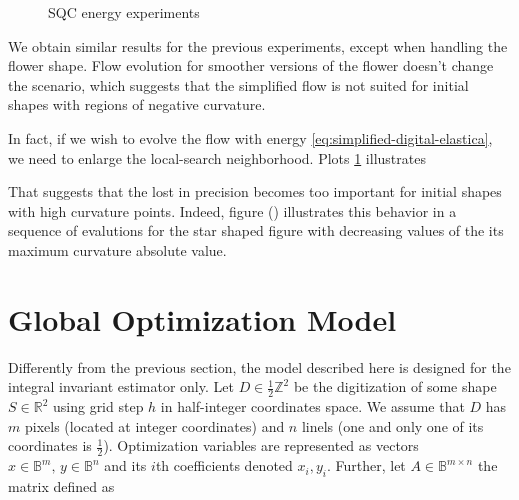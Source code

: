 \begin{figure}[h!]
{}\hspace{1em}%
\hspace{1em}%
\caption{SQC energy experiments}
\label{fig:sqc-energy-experiments}
\end{figure}

We obtain similar results for the previous experiments, except when handling the flower shape. Flow evolution for smoother versions of the flower doesn't change the scenario, which suggests that the simplified flow is not suited for initial shapes with regions of negative curvature.

In fact, if we wish to evolve the flow with energy \eqref{eq:simplified-digital-elastica}, we need to enlarge the local-search neighborhood. Plots \ref{} illustrates




That suggests that the lost in precision becomes too important for initial shapes with high curvature points. Indeed, figure () illustrates this behavior in a sequence of evalutions for the star shaped figure with decreasing values of the its maximum curvature absolute value.

\section{Global Optimization Model}

Differently from the previous section, the model described here is designed for the integral invariant estimator only. Let $D \in \frac{1}{2}\mathbb{Z}^2$ be the digitization of some shape $S \in \mathbb{R}^2$ using grid step $h$ in half-integer coordinates space. We assume that $D$ has $m$ pixels (located at integer coordinates) and $n$ linels (one and only one of its coordinates is $\frac{1}{2}$). Optimization variables are represented as vectors $x \in \mathbb{B}^{m},\, y \in \mathbb{B}^{n}$ and its $i$th coefficients denoted  $x_i,y_i$.  Further, let $A \in \mathbb{B}^{m\times n}$ the matrix defined as


